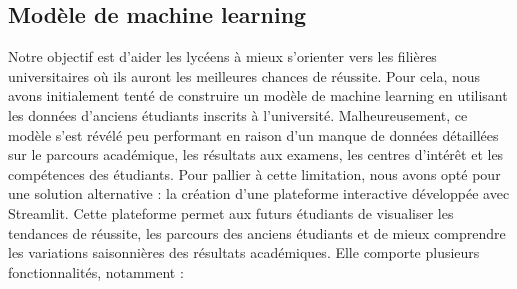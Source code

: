 \subsection{Modèle de machine learning}  
Notre objectif est d'aider les lycéens à mieux s'orienter vers les filières universitaires où ils auront les meilleures chances de réussite.
Pour cela, nous avons initialement tenté de construire un modèle de machine learning en utilisant les données d'anciens étudiants inscrits à l'université. Malheureusement, ce modèle s'est révélé peu performant en raison d'un manque de données détaillées sur le parcours académique, les résultats aux examens, les centres d'intérêt et les compétences des étudiants.
Pour pallier à cette limitation, nous avons opté pour une solution alternative : la création d'une plateforme interactive développée avec Streamlit.
Cette plateforme permet aux futurs étudiants de visualiser les tendances de réussite, les parcours des anciens étudiants et de mieux comprendre les variations saisonnières des résultats académiques. 
Elle comporte plusieurs fonctionnalités, notamment :
